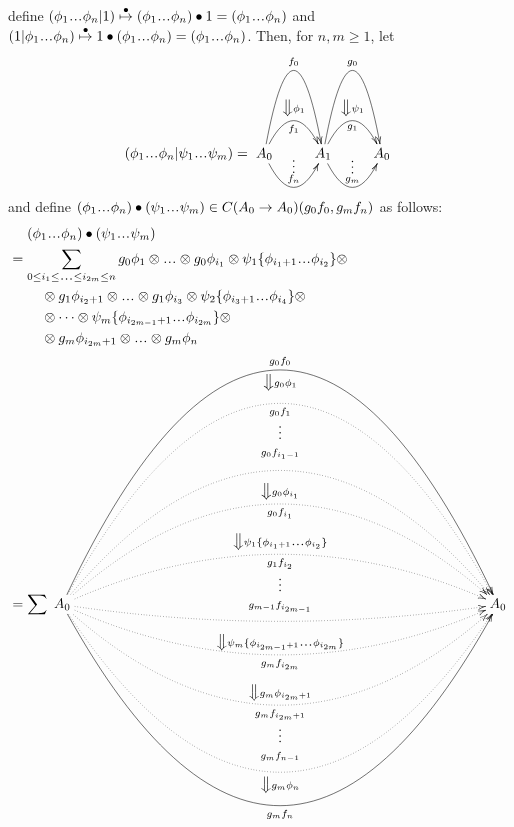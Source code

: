define $(\phi_1\smdots\phi_n | 1) 
\overset{\bullet}{\mapsto} 
(\phi_1\smdots\phi_n) \bullet 1 = 
(\phi_1\smdots\phi_n)$ and 
$(1| \phi_1\smdots\phi_n) 
\overset{\bullet}{\mapsto} 
1 \bullet (\phi_1\smdots\phi_n) = 
(\phi_1\smdots\phi_n)$.
Then, for $n,m\geq 1$, let 
$$
(\phi_1\smdots\phi_n | \psi_1\smdots\psi_m)
=
\xymatrix{
A_0 \ar@/^5pc/[r]^{f_0} 
\ar@/^2pc/[r]^{\big\Downarrow \phi_1}_{f_1} 
\ar@/_2pc/[r]^{\substack{\vdots\\ f_n}}
& A_1 \ar@/^5pc/[r]^{g_0} 
\ar@/^2pc/[r]^{\big\Downarrow \psi_1}_{g_1} 
\ar@/_2pc/[r]^{\substack{\vdots\\ g_m}}
& A_0
}
$$
and define $(\phi_1\smdots\phi_n) \bullet
(\psi_1\smdots\psi_m) \in C(A_0 \to A_0)
(g_0f_0, g_mf_n)$ as follows:
\begin{align*}
&\phantom{{}={}}
(\phi_1\smdots\phi_n) \bullet
(\psi_1\smdots\psi_m)\\
&= 
\sum \limits_{
  0 \leq i_1 \leq \smdots
  \leq i_{2m} \leq n
}
  g_0\phi_1 \otimes \smdots \otimes g_0\phi_{i_1} \otimes 
  \psi_1\{\phi_{i_1+1}\smdots \phi_{i_2}\} \otimes\\
&\phantom{{}move{}}  
  \otimes g_1\phi_{i_2+1} \otimes \smdots \otimes g_1\phi_{i_3} 
  \otimes \psi_2\{\phi_{i_3+1}\smdots \phi_{i_4}\} \otimes \\
&\phantom{{}move{}}    
  \otimes \dots \otimes
  \psi_m\{\phi_{i_{2m-1}+1}\smdots \phi_{i_{2m}}\} \otimes \\
&\phantom{{}move{}}    
  \otimes g_m\phi_{i_{2m}+1} \otimes \smdots \otimes g_m\phi_n \\
&= \sum  
\xymatrix{
A_0 
\ar@/^14pc/[rrrrrrrrrr]^{g_0f_0}_{\big\Downarrow g_0\phi_1}
\ar@{.>}@/^12pc/[rrrrrrrrrr]_{\substack{
  g_0f_1\\ \vdots\\\\g_0f_{i_1-1}}} 
\ar@{.>}@/^8pc/[rrrrrrrrrr]
\ar@{.>}@/^6pc/[rrrrrrrrrr]^{\big\Downarrow g_0\phi_{i_1}}_{g_0f_{i_1}}
\ar@{.>}@/^3pc/[rrrrrrrrrr]^{\big\Downarrow 
  \psi_1\{\phi_{i_1+1}\smdots \phi_{i_2}\}}_{\substack{
  g_1f_{i_2}\\ \vdots \\\\ g_{m-1}f_{i_{2m-1}}}}
\ar@{.>}@/_1pc/[rrrrrrrrrr]
\ar@{.>}@/_3pc/[rrrrrrrrrr]^{\big\Downarrow 
 \psi_m\{\phi_{i_{2m-1}+1}\smdots \phi_{i_{2m}}\}}_{g_m
 f_{i_{2m}}}
\ar@{.>}@/_6pc/[rrrrrrrrrr]^{\big\Downarrow g_m
  \phi_{i_{2m}+1}}_{\substack{
  g_mf_{i_{2m}+1}\\ \vdots\\\\g_mf_{n-1} }} 
\ar@{.>}@/_10pc/[rrrrrrrrrr]_{\big\Downarrow g_m\phi_n}
\ar@/_12pc/[rrrrrrrrrr]_{g_mf_n}
&&&&&&&&&& A_0  
}
\end{align*}
